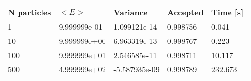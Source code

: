 \begin{table}[h!]
\begin{tabular}{|l|l|l|l|l|}
\hline 
N particles & $<E>$ & Variance & Accepted & Time [s]\\ 
 \hline 
1 & 9.999999e-01 & 1.099121e-14 & 0.998756 & 0.041 \\ \hline 
10 & 9.999999e+00 & 6.963319e-13 & 0.998767 & 0.223 \\ \hline 
100 & 9.999999e+01 & 2.546585e-11 & 0.998711 & 10.117 \\ \hline 
500 & 4.999999e+02 & -5.587935e-09 & 0.998789 & 232.673 \\ \hline 
\end{tabular}
\label{tab:in2} 
\end{table} 
